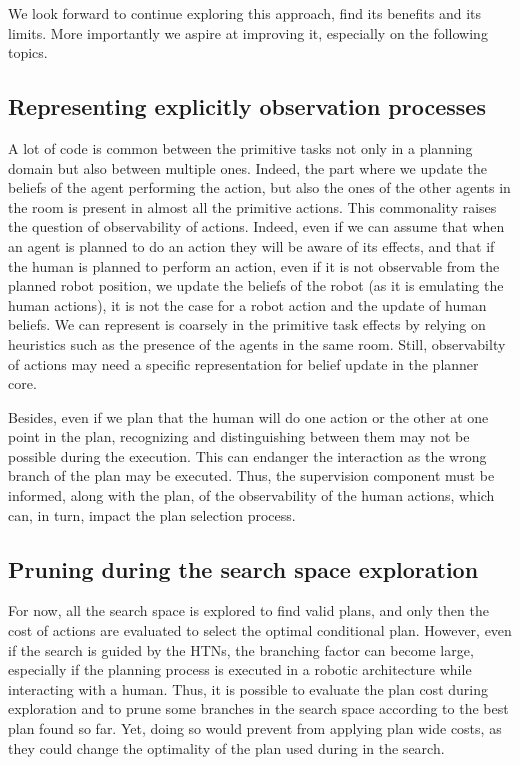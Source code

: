 \documentclass[a4paper,11pt,twoside]{StyleThese}
\begin{document}
We look forward to continue exploring this approach, find its benefits and its limits. More importantly we aspire at improving it, especially on the following topics.

\subsection{Representing explicitly observation processes}
A lot of code is common between the primitive tasks not only in a planning domain but also between multiple ones. Indeed, the part where we update the beliefs of the agent performing the action, but also the ones of the other agents in the room is present in almost all the primitive actions. This commonality raises the question of observability of actions. Indeed, even if we can assume that when an agent is planned to do an action they will be aware of its effects, and that if the human is planned to perform an action, even if it is not observable from the planned robot position, we update the beliefs of the robot (as it is emulating the human actions), it is not the case for a robot action and the update of human beliefs. We can represent is coarsely in the primitive task effects by relying on heuristics such as the presence of the agents in the same room. Still, observabilty of actions may need a specific representation for belief update in the planner core.

Besides, even if we plan that the human will do one action or the other at one point in the plan, recognizing and distinguishing between them may not be possible during the execution. This can endanger the interaction as the wrong branch of the plan may be executed. Thus, the supervision component must be informed, along with the plan, of the observability of the human actions, which can, in turn, impact the plan selection process.


\subsection{Pruning during the search space exploration}
For now, all the search space is explored to find valid plans, and only then the cost of actions are evaluated to select the optimal conditional plan. However, even if the search is guided by the HTNs, the branching factor can become large, especially if the planning process is executed in a robotic architecture while interacting with a human. Thus, it is possible to evaluate the plan cost during exploration and to prune some branches in the search space according to the best plan found so far. Yet, doing so would prevent from applying plan wide costs, as they could change the optimality of the plan used during in the search.
\end{document}
